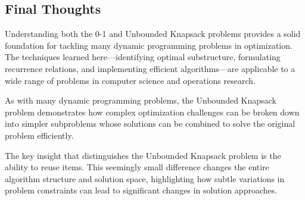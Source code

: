 \documentclass{article}
\begin{document}
\subsection{Final Thoughts}

Understanding both the 0-1 and Unbounded Knapsack problems provides a solid foundation for tackling many dynamic programming problems in optimization. The techniques learned here—identifying optimal substructure, formulating recurrence relations, and implementing efficient algorithms—are applicable to a wide range of problems in computer science and operations research.

As with many dynamic programming problems, the Unbounded Knapsack problem demonstrates how complex optimization challenges can be broken down into simpler subproblems whose solutions can be combined to solve the original problem efficiently.

\begin{tcolorbox}[notebox, title=Final Note]
The key insight that distinguishes the Unbounded Knapsack problem is the ability to reuse items. This seemingly small difference changes the entire algorithm structure and solution space, highlighting how subtle variations in problem constraints can lead to significant changes in solution approaches.
\end{tcolorbox}
\end{document}
